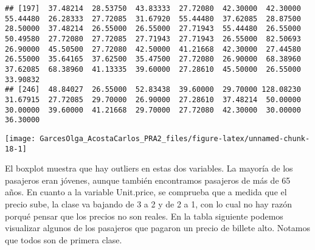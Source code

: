 \documentclass[
]{article}
\newenvironment{Shaded}{\begin{snugshade}}{\end{snugshade}}
\newcommand{\CommentTok}[1]{\textcolor[rgb]{0.50,0.62,0.50}{#1}}
\newcommand{\DecValTok}[1]{\textcolor[rgb]{0.86,0.86,0.80}{#1}}
\newcommand{\KeywordTok}[1]{\textcolor[rgb]{0.94,0.87,0.69}{#1}}
\newcommand{\NormalTok}[1]{\textcolor[rgb]{0.80,0.80,0.80}{#1}}
\newcommand{\OperatorTok}[1]{\textcolor[rgb]{0.94,0.94,0.82}{#1}}
\begin{document}
\begin{verbatim}
## [197]  37.48214  28.53750  43.83333  27.72080  42.30000  42.30000  55.44480  26.28333  27.72085  31.67920  55.44480  37.62085  28.87500  28.50000  37.48214  26.55000  26.55000  27.71943  55.44480  26.55000  50.49580  27.72080  27.72085  27.71943  27.71943  26.55000  82.50693  26.90000  45.50500  27.72080  42.50000  41.21668  42.30000  27.44580  26.55000  35.64165  37.62500  35.47500  27.72080  26.90000  68.38960  37.62085  68.38960  41.13335  39.60000  27.28610  45.50000  26.55000  33.90832
## [246]  48.84027  26.55000  52.83438  39.60000  29.70000 128.08230  31.67915  27.72085  29.70000  26.90000  27.28610  37.48214  50.00000  30.00000  39.60000  41.21668  29.70000  27.72080  42.30000  30.00000  36.30000
\end{verbatim}

\begin{center}\texttt{[image: GarcesOlga\_AcostaCarlos\_PRA2\_files/figure-latex/unnamed-chunk-18-1]} \end{center}

El boxplot muestra que hay outliers en estas dos variables. La mayoría
de los pasajeros eran jóvenes, aunque también encontramos pasajeros de
más de 65 años. En cuanto a la variable Unit.price, se comprueba que a
medida que el precio sube, la clase va bajando de 3 a 2 y de 2 a 1, con
lo cual no hay razón porqué pensar que los precios no son reales. En la
tabla siguiente podemos visualizar algunos de los pasajeros que pagaron
un precio de billete alto. Notamos que todos son de primera clase.

\begin{Shaded}
\end{Shaded}
\end{document}
